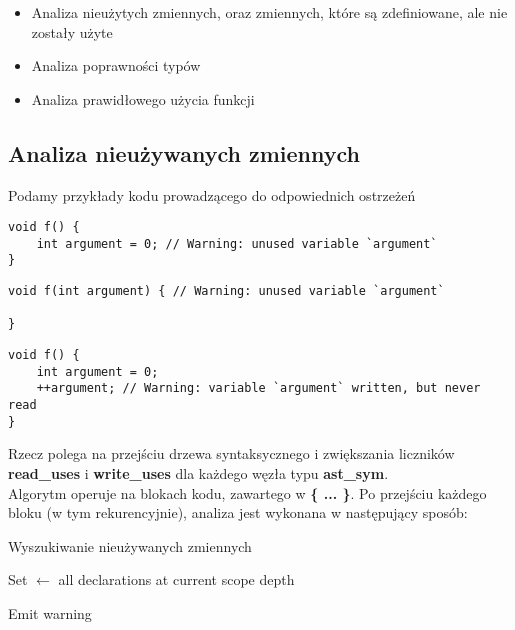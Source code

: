 \documentclass[leqno, 12pt]{article}
\newcommand{\spacing}{\vskip 0.5cm}
\begin{document}
		\begin{itemize}
			\item Analiza nieużytych zmiennych, oraz zmiennych, które są zdefiniowane, ale nie zostały użyte
			\item Analiza poprawności typów
			\item Analiza prawidłowego użycia funkcji
		\end{itemize}
		
		\subsection{Analiza nieużywanych zmiennych}
			
			Podamy przykłady kodu prowadzącego do odpowiednich ostrzeżeń
			
			\spacing

			\begin{lstlisting}[label={lst:warn-unused-var}]
void f() {
	int argument = 0; // Warning: unused variable `argument`
}
			\end{lstlisting}

			\begin{lstlisting}[label={lst:warn-unused-var}]
void f(int argument) { // Warning: unused variable `argument`

}
			\end{lstlisting}
			
			\begin{lstlisting}[label={lst:warn-unused-var}]
void f() {
	int argument = 0;
	++argument; // Warning: variable `argument` written, but never read
}
			\end{lstlisting}

			
			\spacing
			
			Rzecz polega na przejściu drzewa syntaksycznego i zwiększania liczników
			\textbf{read_uses} i \textbf{write_uses} dla każdego węzła typu
			\textbf{ast_sym}.
			\\
			
			Algorytm operuje na blokach kodu, zawartego w \textbf{\{ ... \}}. Po przejściu każdego bloku
			(w tym rekurencyjnie), analiza jest wykonana w następujący sposób:

			\begin{algorithm}
				\caption{Wyszukiwanie nieużywanych zmiennych}
				\begin{algorithmic}[1]

					\State Set $\gets$ all declarations at current scope depth

							\State Emit warning
						\EndIf
					\EndFor
				\EndProcedure

				\end{algorithmic}
			\end{algorithm}
			
\end{document}
